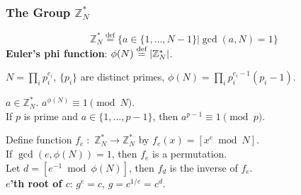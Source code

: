 \begin{frame}\frametitle{The Group $\mathbb{Z}_N^*$}
\[ \mathbb{Z}_N^* \overset{\text{def}}{=} \{a \in \{1,\dotsc,N-1 \} | \gcd(a,N) = 1\} \]
\textbf{Euler's phi function}: $\phi(N) \overset{\text{def}}{=} \lvert\mathbb{Z}_N^*\rvert$.
\begin{theorem}
$N = \prod_ip_i^{e_i}$, $\{p_i\}$ are distinct primes, $\phi(N) = \prod_ip_i^{e_i-1}(p_i-1)$.
\end{theorem}
\begin{corollary}
$a \in \mathbb{Z}_N^*$. $a^{\phi (N)} \equiv 1 \pmod N$.\\
If $p$ is prime and $a \in \{1,\dotsc,p-1\}$, then $a^{p-1} \equiv 1 \pmod p$.
\end{corollary}
\begin{corollary}
Define function $f_e\;:$ $\mathbb{Z}^*_N \to \mathbb{Z}^*_N$ by $f_e(x) =[x^e \bmod N]$. \\ If $\gcd(e,\phi(N))=1$, then $f_e$ is a permutation. \\
Let $d = [e^{-1} \bmod \phi(N)]$, then $f_d$ is the inverse of $f_e$.\\
\textbf{$e$'th root of $c$}: $g^e = c$, $g = c^{1/e} = c^{d}$. 
\end{corollary}
\end{frame}
\begin{comment}
\begin{frame}\frametitle{Subgroups}
If $\mathbb{G}$ is a group, a set $\mathbb{H} \subseteq \mathbb{G}$ is a \textbf{subgroup} of $\mathbb{G}$ if $\mathbb{H}$ itself forms a group under the same operation associated with $\mathbb{G}$. $\mathbb{H}$ is a \textbf{strict subgroup} if $\mathbb{H} \neq \mathbb{G}$.
\begin{itemize}
\item If $\mathbb{H} \subseteq \mathbb{G}$, $\mathbb{H}$ contains the identity element of $\mathbb{G}$, and $\mathbb{H}$ is closed, then $\mathbb{H}$ is a subgroup of $\mathbb{G}$.
\item \textbf{Lagrange's theorem}: For a finite group $\mathbb{G}$ and its subgroup $\mathbb{H}$,  $\abs{\mathbb{H}} \mid \abs{\mathbb{G}}$.
\item $\mathbb{H}$ is a strict subgroup of a finite group $\mathbb{G}$, then $\abs{\mathbb{H}} \le \abs{\mathbb{G}}/2$.
\end{itemize}
\end{frame}
\end{comment}
